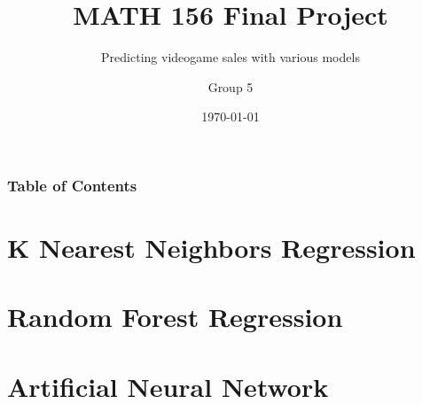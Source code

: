 \documentclass{beamer}
\title{MATH 156 Final Project}
\subtitle{Predicting videogame sales with various models}
\author{Group 5}
\institute{University of California, Los Angeles}
\date{\today}
\begin{document}
\begin{frame}
    \titlepage
\end{frame}

\begin{frame}
    \frametitle{Table of Contents}
    \tableofcontents
\end{frame}

\section{K Nearest Neighbors Regression}


\section{Random Forest Regression}


\section{Artificial Neural Network}

\end{document}
